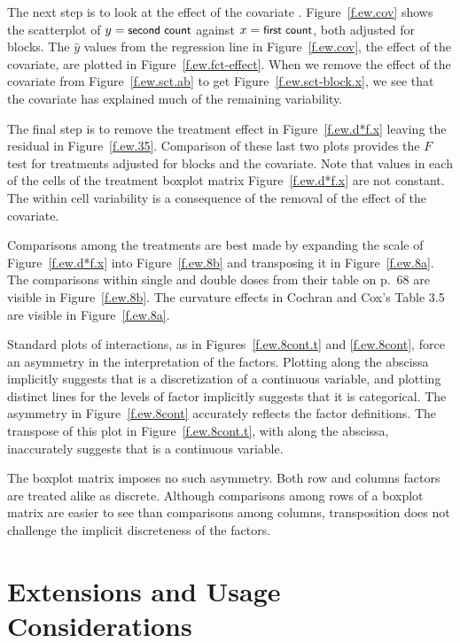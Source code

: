 The next step is to look at the effect of the covariate .  Figure~\ref{f.ew.cov} shows the scatterplot of
$y=\mbox{{\protect\small\sf second count}}$ against $x=\mbox{{\protect\small\sf first count}}$, both adjusted
for blocks.  The $\widehat y$ values from the regression line in
Figure~\ref{f.ew.cov}, the effect of the covariate, are plotted in
Figure~\ref{f.ew.fct-effect}.
When we remove the effect of the covariate from
Figure~\ref{f.ew.sct.ab} to get Figure~\ref{f.ew.sct-block.x}, we
see that the covariate has explained much of the remaining
variability.

The final step is to remove the treatment effect in
Figure~\ref{f.ew.d*f.x} leaving the residual in
Figure~\ref{f.ew.35}.  Comparison of these last two plots
provides the $F$ test for treatments adjusted for blocks and the
covariate.  Note that values in each of the cells of the
treatment boxplot matrix Figure~\ref{f.ew.d*f.x} are not
constant.  The within cell  variability is a consequence of the
removal of the effect of the covariate.

Comparisons among the treatments are best made by expanding the scale
of Figure~\ref{f.ew.d*f.x} into Figure~\ref{f.ew.8b} and transposing
it in Figure~\ref{f.ew.8a}.  The comparisons within single and double
doses from their table on p.~68 are visible in Figure~\ref{f.ew.8b}.
The curvature effects in Cochran and Cox's Table 3.5 are visible in
Figure~\ref{f.ew.8a}.

Standard plots of interactions, as in Figures~\ref{f.ew.8cont.t}
and \ref{f.ew.8cont},
force an asymmetry in the interpretation of the factors.
Plotting  along the abscissa implicitly suggests that
 is a discretization of a continuous variable, and
plotting distinct lines for the levels of factor 
implicitly suggests that it is categorical.  The asymmetry in
Figure~\ref{f.ew.8cont} accurately reflects the factor
definitions.  The transpose of this plot in
Figure~\ref{f.ew.8cont.t}, with  along the abscissa,
inaccurately suggests that  is a continuous variable.

The boxplot matrix imposes no such asymmetry.  Both row and
columns factors are treated alike as discrete.	Although
comparisons among rows of a boxplot matrix are easier to see than
comparisons among columns, transposition does not challenge the
implicit discreteness of the factors.



\section{Extensions and Usage Considerations} \label{sec-extend}

